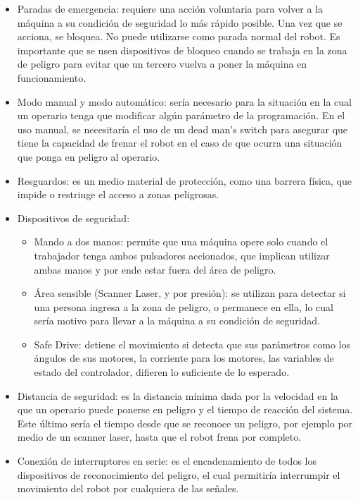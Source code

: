 \documentclass[a4paper,11pt]{article}
\begin{document}
\begin{itemize}
    \item Paradas de emergencia: requiere una acción voluntaria para volver a la máquina a su condición de seguridad lo más rápido posible. Una vez que se acciona, se bloquea. No puede utilizarse como parada normal del robot. Es importante que se usen dispositivos de bloqueo cuando se trabaja en la zona de peligro para evitar que un tercero vuelva a poner la máquina en funcionamiento. 
    
    \item Modo manual y modo automático: sería necesario para la situación en la cual un operario tenga que modificar algún parámetro de la programación. En el uso manual, se necesitaría el uso de un dead man's switch para asegurar que tiene la capacidad de frenar el robot en el caso de que ocurra una situación que ponga en peligro al operario.  
    
    \item Resguardos: es un medio material de protección, como una barrera física, que  impide o restringe el acceso a zonas peligrosas. 
    
    \item Dispositivos de seguridad:  
    \begin{itemize}
        \item Mando a dos manos: permite que una máquina opere solo cuando el trabajador tenga ambos pulsadores accionados, que implican utilizar ambas manos y por ende estar fuera del área de peligro.  
        \item Área sensible (Scanner Laser, y por presión): se utilizan para detectar si una persona ingresa a la zona de peligro, o permanece en ella, lo cual sería motivo para llevar a la máquina a su condición de seguridad. 
        \item Safe Drive: detiene el movimiento si detecta que sus parámetros como los ángulos de sus motores, la corriente para los motores, las variables de estado del controlador, difieren lo suficiente de lo esperado. 
    \end{itemize}
    
    \item Distancia de seguridad: es la distancia mínima dada por la velocidad en la que un operario puede ponerse en peligro y el tiempo de reacción del sistema. Este último sería el tiempo desde que se reconoce un peligro, por ejemplo por medio de un scanner laser, hasta que el robot frena por completo.
    
    \item Conexión de interruptores en serie: es el encadenamiento de todos los dispositivos de reconocimiento del peligro, el cual permitiría interrumpir el movimiento del robot por cualquiera de las señales.
    
\end{itemize}
\end{document}
